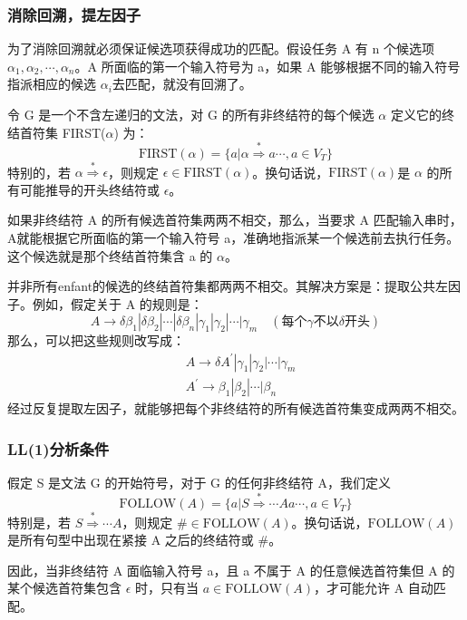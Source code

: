 \subsubsection{消除回溯，提左因子}

为了消除回溯就必须保证候选项获得成功的匹配。假设任务 A 有 n 个候选项 $\alpha_1,\alpha_2,\cdots,\alpha_n$。A 所面临的第一个输入符号为 a，如果 A 能够根据不同的输入符号指派相应的候选 $\alpha_i$去匹配，就没有回溯了。

令 G 是一个不含左递归的文法，对 G 的所有非终结符的每个候选 $\alpha$ 定义它的终结首符集 FIRST($\alpha$) 为：
\[\text{FIRST}(\alpha) = \{ a | \alpha \stackrel{*}{\Rightarrow} a \cdots, a \in V_{T} \}\]
特别的，若 $\alpha \stackrel{*}{\Rightarrow} \epsilon$，则规定 $\epsilon \in \text{FIRST}(\alpha)$。换句话说，$\text{FIRST}(\alpha)$是 $\alpha$ 的所有可能推导的开头终结符或 $\epsilon$。

如果非终结符 A 的所有候选首符集两两不相交，那么，当要求 A 匹配输入串时，A就能根据它所面临的第一个输入符号 a，准确地指派某一个候选前去执行任务。这个候选就是那个终结首符集含 a 的 $\alpha$。

并非所有enfant的候选的终结首符集都两两不相交。其解决方案是：提取公共左因子。例如，假定关于 A 的规则是：
\[ A \rightarrow \delta \beta_1 | \delta \beta_2 | \cdots | \delta \beta_n | \gamma_1 | \gamma_2 | \cdots | \gamma_m \quad (\text{每个} \gamma \text{不以} \delta \text{开头}) \]
那么，可以把这些规则改写成：
\begin{equation}
    \begin{aligned}
        &A \rightarrow \delta A^{'} | \gamma_1 | \gamma_2 | \cdots | \gamma_m \\
        &A^{'} \rightarrow \beta_1 | \beta_2 | \cdots | \beta_n \nonumber
    \end{aligned}
\end{equation}
经过反复提取左因子，就能够把每个非终结符的所有候选首符集变成两两不相交。

\subsubsection{LL(1)分析条件}

假定 S 是文法 G 的开始符号，对于 G 的任何非终结符 A，我们定义
\[ \text{FOLLOW}(A) = \{ a|S\stackrel{*}{\Rightarrow} \cdots Aa \cdots, a\in V_T \} \]
特别是，若 $S\stackrel{*}{\Rightarrow} \cdots A$，则规定 $\# \in \text{FOLLOW}(A)$。换句话说，$\text{FOLLOW}(A)$ 是所有句型中出现在紧接 A 之后的终结符或 \#。

因此，当非终结符 A 面临输入符号 a，且 a 不属于 A 的任意候选首符集但 A 的某个候选首符集包含 $\epsilon$ 时，只有当 $a \in \text{FOLLOW}(A)$，才可能允许 A 自动匹配。


